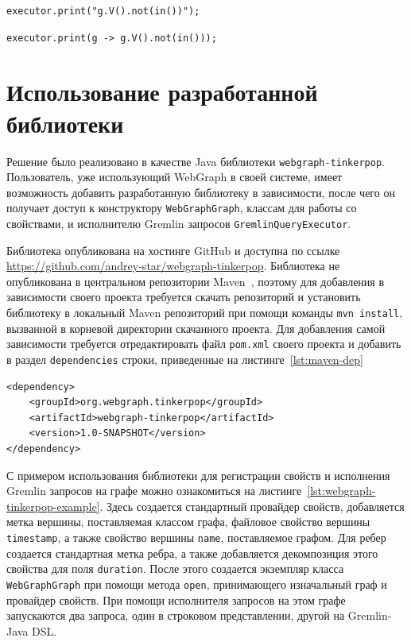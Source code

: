 \documentclass[times,specification,annotation]{itmo-student-thesis}
\begin{document}
\begin{lstlisting}[float=!h,caption={Строковый Gremlin  запрос},label={lst:gremlin-str}]
executor.print("g.V().not(in())");
\end{lstlisting}

\begin{lstlisting}[float=!h,caption={Запрос на Gremlin-Java DSL},label={lst:gremlin-dsl}]
executor.print(g -> g.V().not(in()));
\end{lstlisting}

\section{Использование разработанной библиотеки}

Решение было реализовано в качестве Java библиотеки \texttt{webgraph-tinkerpop}. Пользователь, уже использующий WebGraph в своей системе, имеет возможность добавить разработанную библиотеку в зависимости, после чего он получает доступ к конструктору \texttt{WebGraphGraph}, классам для работы со свойствами, и исполнителю Gremlin запросов \texttt{GremlinQueryExecutor}.

Библиотека опубликована на хостинге GitHub и доступна по ссылке \url{https://github.com/andrey-star/webgraph-tinkerpop}. Библиотека не опубликована в центральном репозитории Maven~\cite{maven}, поэтому для добавления в зависимости своего проекта требуется скачать репозиторий и установить библиотеку в локальный Maven репозиторий при помощи команды \texttt{mvn install}, вызванной в корневой директории скачанного проекта. Для добавления самой зависимости требуется отредактировать файл \texttt{pom.xml} своего проекта и добавить в раздел \texttt{dependencies} строки, приведенные на листинге~\ref{lst:maven-dep}

\begin{lstlisting}[float=!h,caption={Добавление \texttt{webgraph-tinkerpop} в зависимости проекта},label={lst:maven-dep}]
<dependency>
    <groupId>org.webgraph.tinkerpop</groupId>
    <artifactId>webgraph-tinkerpop</artifactId>
    <version>1.0-SNAPSHOT</version>
</dependency>
\end{lstlisting}

С примером использования библиотеки для регистрации свойств и исполнения Gremlin запросов на графе можно ознакомиться на листинге~\ref{lst:webgraph-tinkerpop-example}. Здесь создается стандартный провайдер свойств, добавляется метка вершины, поставляемая классом графа, файловое свойство вершины \texttt{timestamp}, а также свойство вершины \texttt{name}, поставляемое графом. Для ребер создается стандартная метка ребра, а также добавляется декомпозиция этого свойства для поля \texttt{duration}. После этого создается экземпляр класса \texttt{WebGraphGraph} при помощи метода \texttt{open}, принимающего изначальный граф и провайдер свойств. При помощи исполнителя запросов на этом графе запускаются два запроса, один в строковом представлении, другой на Gremlin-Java DSL.
\end{document}
